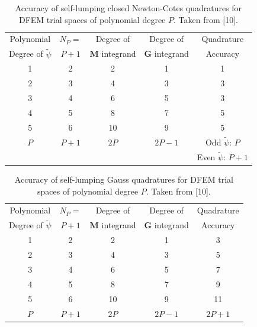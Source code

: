 \begin{table}[!ht]
\centering
\caption{Accuracy of self-lumping closed Newton-Cotes quadratures for DFEM trial spaces of polynomial degree $P$.  Taken from [10].}
\begin{tabular}{|c|c|c|c|c|} 
\hline
  Polynomial 											& $N_P=$		  & Degree of   					 &  Degree of   					& Quadrature \\
  Degree  of $\widetilde{\psi}$		& $P+1$		 		& $\mathbf{M}$ integrand & $\mathbf{G}$ integrand & Accuracy  \\
	\hline
				1   											&   2   		&   2   								&		1												&				1			\\ 		\hline
				2   											&   3   		&    4  								&			3											&				3			\\		\hline	
				3   											&   4   		&   6   								&			5 										&	3						\\		\hline
				4   											&   5   		&   8   								&			7 										&	5					  \\		\hline
				5   											&   6   		&    10  								&			9											&	5						\\		\hline
				$P$  										 &   $P+1$   &   $2P$   							&	 $2P-1$									  &  Odd $\widetilde{\psi}$: $P$    \\
				{}											&							&											&															& Even $\widetilde{\psi}$: $P+1$  \\ \hline
\end{tabular}
\label{tbl:int_acc_nc} 
\end{table}
\begin{table}[!ht]
\centering
\caption{Accuracy of self-lumping Gauss quadratures for DFEM trial spaces of polynomial degree $P$.  Taken from [10].}
\begin{tabular}{|c|c|c|c|c|} 
\hline
  Polynomial 											& $N_P=$		  & Degree of   					 &  Degree of   					&  Quadrature  \\
  Degree  of $\widetilde{\psi}$		& $P+1$		 		& $\mathbf{M}$ integrand & $\mathbf{G}$ integrand  &   Accuracy 		 \\ \hline
				1   											&   2   		&   2   								&		1												&				3		\\ 		\hline
				2   											&   3   		&    4  								&			3											&				5		\\		\hline	
				3   											&   4   		&   6   								&			5 										&				7		\\		\hline
				4   											&   5   		&   8   								&			7 									  &				9	  \\		\hline
				5   											&   6   		&    10  								&			9											&				11	\\		\hline
				$P$  										 &   $P+1$   &   $2P$   							&	 $2P-1$									  &   $2P+1$	\\ \hline
\end{tabular}
\label{tbl:int_acc_gauss} 
\end{table}
